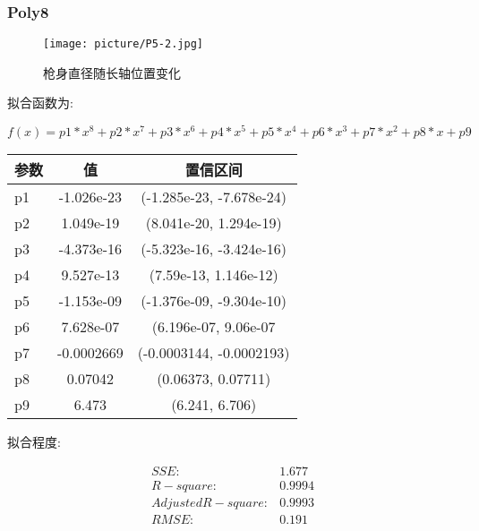 \documentclass[UTF8]{ctexart}
\begin{document}
			\subsubsection{Poly8}
				\begin{figure}[h]
						\texttt{[image: picture/P5-2.jpg]}
						\caption{枪身直径随长轴位置变化}
				\end{figure}
				\begin{flushleft}
					拟合函数为:
				\end{flushleft}
				\begin{center}
					\[  f(x) = p1*x^8 + p2*x^7 + p3*x^6 + p4*x^5 + p5*x^4 + p6*x^3 + p7*x^2 + p8*x + p9\]				
				\begin{tabular}{|l|c|c|}
					\hline
					参数&值&置信区间\\
					\hline
					p1 & -1.026e-23 &  (-1.285e-23, -7.678e-24)\\
					\hline
					p2 & 1.049e-19&  (8.041e-20, 1.294e-19)\\
					\hline
					p3 & -4.373e-16&  (-5.323e-16, -3.424e-16)\\
					\hline
					p4 &  9.527e-13&  (7.59e-13, 1.146e-12)\\
					\hline
					p5 & -1.153e-09&  (-1.376e-09, -9.304e-10)\\
					\hline
					p6 & 7.628e-07&  (6.196e-07, 9.06e-07\\
					\hline
					p7 & -0.0002669&  (-0.0003144, -0.0002193)\\
					\hline
					p8 & 0.07042&  (0.06373, 0.07711)\\
					\hline
					p9 & 6.473&  (6.241, 6.706)\\
					\hline
				\end{tabular}
			\end{center}
			\begin{flushleft}
				拟合程度:
			\end{flushleft}
				\begin{center}
				$$
				\begin{matrix}
				SSE:&1.677\\
				R-square:&0.9994\\
				Adjusted R-square:&0.9993\\
				RMSE:&0.191\\
				\end{matrix}
				$$
			\end{center}
\end{document}
